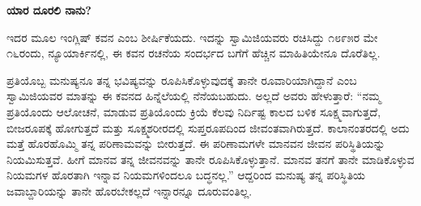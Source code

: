 \begin{myquote}
\end{myquote}

\begin{myquote}
\end{myquote}

\begin{myquote}
\end{myquote}

\begin{myquote}
\end{myquote}

\selectkan

\begin{center}
\textbf{ಯಾರ ದೂರಲಿ ನಾನು?}
\end{center}

ಇದರ ಮೂಲ ಇಂಗ್ಲಿಷ್ ಕವನ  ಎಂಬ ಶೀರ್ಷಿಕೆಯದು. ಇದನ್ನು ಸ್ವಾಮಿಜಿಯವರು ರಚಿಸಿದ್ದು ೧೮೯೫ರ ಮೇ ೧೬ರಂದು, ನ್ಯೂಯಾರ್ಕಿನಲ್ಲಿ, ಈ ಕವನ ರಚನೆಯ ಸಂದರ್ಭದ ಬಗೆಗೆ ಹೆಚ್ಚಿನ ಮಾಹಿತಿಯೇನೂ ದೊರೆತಿಲ್ಲ.

ಪ್ರತಿಯೊಬ್ಬ ಮನುಷ್ಯನೂ ತನ್ನ ಭವಿಷ್ಯವನ್ನು ರೂಪಿಸಿಕೊಳ್ಳುವುದಕ್ಕೆ ತಾನೇ ರೂವಾರಿಯಾಗಿದ್ದಾನೆ ಎಂಬ ಸ್ವಾಮಿಜಿಯವರ ಮಾತನ್ನು ಈ ಕವನದ ಹಿನ್ನೆಲೆಯಲ್ಲಿ ನೆನೆಯಬಹುದು. ಅಲ್ಲದೆ ಅವರು ಹೇಳುತ್ತಾರೆ: “ನಮ್ಮ ಪ್ರತಿಯೊಂದು ಆಲೋಚನೆ, ಮಾಡುವ ಪ್ರತಿಯೊಂದು ಕ್ರಿಯೆ ಕೆಲವು ನಿರ್ದಿಷ್ಟ ಕಾಲದ ಬಳಿಕ ಸೂಕ್ಷ್ಮವಾಗುತ್ತದೆ, ಬೀಜರೂಪಕ್ಕೆ ಹೋಗುತ್ತದೆ ಮತ್ತು ಸೂಕ್ಷ್ಮಶರೀರದಲ್ಲಿ ಸುಪ್ತರೂಪದಿಂದ ಜೀವಂತವಾಗಿರುತ್ತದೆ. ಕಾಲಾನಂತರದಲ್ಲಿ ಅದು ಮತ್ತೆ ಹೊರಹೊಮ್ಮಿ ತನ್ನ ಪರಿಣಾಮವನ್ನು ಬೀರುತ್ತದೆ. ಈ ಪರಿಣಾಮಗಳೇ ಮಾನವನ ಜೀವನ ಪರಿಸ್ಥಿತಿಯನ್ನು ನಿಯಮಿಸುತ್ತವೆ. ಹೀಗೆ ಮಾನವ ತನ್ನ ಜೀವನವನ್ನು ತಾನೇ ರೂಪಿಸಿಕೊಳ್ಳುತ್ತಾನೆ. ಮಾನವ ತನಗೆ ತಾನೇ ಮಾಡಿಕೊಳ್ಳುವ ನಿಯಮಗಳ ಹೊರತಾಗಿ ಇನ್ನಾವ ನಿಯಮಗಳಿಂದಲೂ ಬದ್ಧನಲ್ಲ.” ಆದ್ದರಿಂದ ಮನುಷ್ಯ ತನ್ನ ಪರಿಸ್ಥಿತಿಯ ಜವಾಬ್ದಾರಿಯನ್ನು ತಾನೇ ಹೊರಬೇಕಲ್ಲದೆ ಇನ್ನಾರನ್ನೂ ದೂರುವಂತಿಲ್ಲ.

